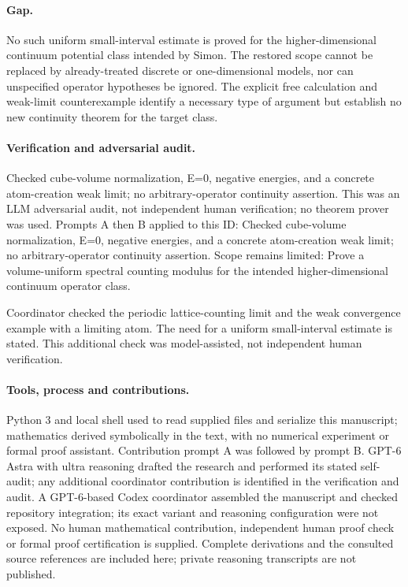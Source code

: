 \documentclass[11pt]{article}
\begin{document}
\paragraph{Gap.}No such uniform small-interval estimate is proved for the higher-dimensional continuum potential class intended by Simon. The restored scope cannot be replaced by already-treated discrete or one-dimensional models, nor can unspecified operator hypotheses be ignored. The explicit free calculation and weak-limit counterexample identify a necessary type of argument but establish no new continuity theorem for the target class.

\paragraph{Verification and adversarial audit.}
Checked cube-volume normalization, E=0, negative energies, and a concrete atom-creation weak limit; no arbitrary-operator continuity assertion. This was an LLM adversarial audit, not independent human verification; no theorem prover was used. Prompts A then B applied to this ID: Checked cube-volume normalization, E=0, negative energies, and a concrete atom-creation weak limit; no arbitrary-operator continuity assertion. Scope remains limited: Prove a volume-uniform spectral counting modulus for the intended higher-dimensional continuum operator class.

Coordinator checked the periodic lattice-counting limit and the weak convergence example with a limiting atom. The need for a uniform small-interval estimate is stated. This additional check was model-assisted, not independent human verification.

\paragraph{Tools, process and contributions.}
Python 3 and local shell used to read supplied files and serialize this manuscript; mathematics derived symbolically in the text, with no numerical experiment or formal proof assistant. Contribution prompt A was followed by prompt B. GPT-6 Astra with ultra reasoning drafted the research and performed its stated self-audit; any additional coordinator contribution is identified in the verification and audit. A GPT-6-based Codex coordinator assembled the manuscript and checked repository integration; its exact variant and reasoning configuration were not exposed. No human mathematical contribution, independent human proof check or formal proof certification is supplied. Complete derivations and the consulted source references are included here; private reasoning transcripts are not published.
\end{document}
